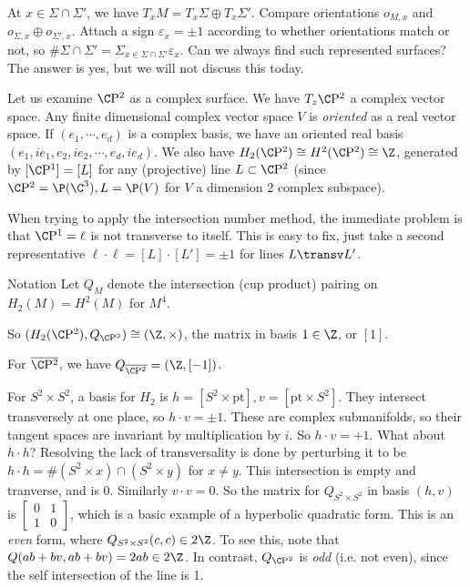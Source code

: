At $x \in \Sigma \cap \Sigma'$, we have $T_x M= T_x \Sigma \oplus T_x \Sigma'$. Compare orientations $o_{M,x}$ and $o_{\Sigma,x}\oplus o_{\Sigma', x}$. Attach a sign $\varepsilon _x = \pm 1$ according to whether orientations match or not, so $\# \Sigma \cap \Sigma' = \Sigma _{x \in \Sigma \cap \Sigma'}\varepsilon _x$. Can we always find such represented surfaces? The answer is yes, but we will not discuss this today.
\begin{example}
    Let us examine $\C \mathrm{P}^2$ as a complex surface. We have $T_z \C \mathrm{P}^2$ a complex vector space. Any finite dimensional complex vector space $V$ is \emph{oriented} as a real vector space. If $(e_1, \cdots ,e_d)$ is a complex basis, we have an oriented real basis $(e_1,ie_1, e_2, ie_2, \cdots ,e_d, ie_d)$. We also have $H_2(\C \mathrm{P}^2) \cong H^2(\C \mathrm{P}^2) \cong \Z$, generated by $[\C \mathrm{P}^1] = [L]$ for any (projective) line $L \subset \C\mathrm{P}^2$ (since $\C \mathrm{P}^2 = \P(\C^3), L = \P(V)$ for $V$ a dimension 2 complex subspace).

    When trying to apply the intersection number method, the immediate problem is that $\C \mathrm{P}^1 = \ell$ is not transverse to itself. This is easy to fix, just take a second representative $\ell \cdot  \ell = [L] \cdot [L']=\pm 1$ for lines $L \transv L'$.
\begin{namedthing}{Notation} 
    Let $Q_M$ denote the intersection (cup product) pairing on $H_2(M) = H^2(M)$ for $M^4$.
\end{namedthing}
So $(H_2(\C \mathrm{P^2}), Q_{\C \mathrm{P^2}})\cong (\Z, \times) $, the matrix in basis $1 \in \Z$, or $[1]$.
\end{example}
\begin{example}
    For $\overline{\C \mathrm{P^2}}$, we have $Q _{\overline{\C \mathrm{P^2}}} = (\Z, [-1])$. 
\end{example}
\begin{example}
    For $S^2 \times S^2$, a basis for $H_2$ is $h = [S^2 \times   \mathrm{pt}], v = [\mathrm{pt} \times  S^2]$. They intersect transversely at one place, so $h \cdot v = \pm 1$. These are complex submanifolds, so their tangent spaces are invariant by multiplication by $i$. So $h\cdot v = +1$. What about $h \cdot h$? Resolving the lack of transversality is done by perturbing it to be $h \cdot h = \# (S^2 \times  {x} ) \cap  (S^2 \times  {y} )$ for $x\neq y$. This intersection is empty and tranverse, and is 0. Similarly  $v \cdot v=0$. So the matrix for $Q _{S^2 \times S^2}$ in basis $(h,v)$ is $\left[ 
    \begin{smallmatrix}
        0 & 1 \\ 1 & 0
\end{smallmatrix}\right] $, which is a basic example of a hyperbolic quadratic form. This is an \emph{even} form, where $Q _{S^2 \times S^2}(c, c) \in 2 \Z$. To see this, note that $Q(ab + bv, ab + bv) = 2ab \in 2 \Z$. In contrast, $Q _{\C \mathrm{P^2}}$ is \emph{odd} (i.e. not even), since the self intersection of the line is 1.
\end{example}
